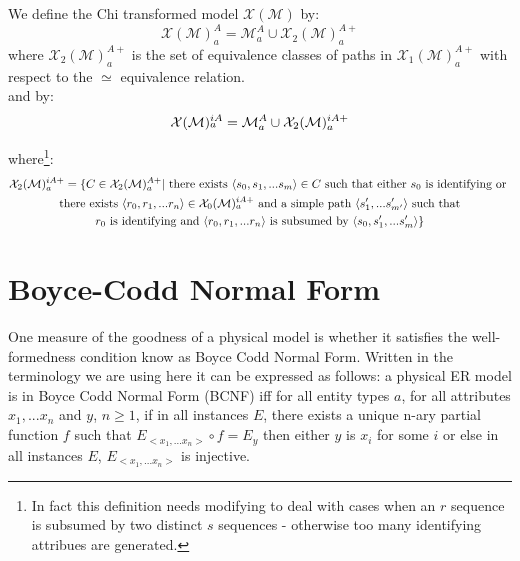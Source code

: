 \documentclass[10pt,a4paper]{article}
\newcommand{\genericmodel}{\mathcal{M}}
\newcommand{\logtophys}{\mathcal{X}}
\newcommand{\chen}{\mathcal{X}_0}
\newcommand{\chigenericmodel}{\logtophys(\genericmodel)}
\newcommand{\allAttrs}{\genericmodel^A}
\newcommand{\attrs}[1]{\allAttrs_{#1}}
\newcommand{\chenFKidAttrs}[1]{\chen(\genericmodel)^{iA+}_{\raisebox{2pt}{$\scriptstyle{#1}$}}}
\newcommand{\chiOne}[1]{{\mathcal{X}_1}(\genericmodel)^{A+}_{#1}}
\newcommand{\chenFKclasses}[1]{{\mathcal{X}_2}(\genericmodel)^{A+}_{#1}}
\newcommand{\chenFKidClasses}[1]{{\mathcal{X}_2}(\genericmodel)^{iA+}_{#1}}
\newcommand{\chiAttrs}[1]{\logtophys(\genericmodel)^A_{#1}}
\newcommand{\chiIdAttrs}[1]{\logtophys(\genericmodel)^{iA}_{\raisebox{2pt}{$\scriptstyle{#1}$}}}
\begin{document}
\noindent We define the Chi transformed model $\chigenericmodel$ by:
$$
\chiAttrs{a} = \attrs{a} \cup \chenFKclasses{a}
$$
\noindent where $\chenFKclasses{a}$ is the set of equivalence classes of paths in $\chiOne{a}$
with respect to the $\simeq$ equivalence relation. \\ 

\noindent and by:
$$
\chiIdAttrs{a} = \attrs{a} \cup \chenFKidClasses{a}
$$

\noindent where\footnote{In fact this definition needs modifying to deal with cases when an $r$ sequence is subsumed by two distinct
$s$ sequences - otherwise too many identifying attribues are generated. %
}:
\begin{multline}
\chenFKidClasses{a} = 
\{ C \in \chenFKclasses{a} | \mbox{ there exists }
\langle s_0, s_1,...s_m \rangle \in C \mbox{ such that either }
 s_0 \mbox{ is identifying or } \\
 \mbox { there exists } \langle r_0, r_1,...r_n \rangle \in \chenFKidAttrs{a} \mbox{ and a simple path }  \langle s'_1,...s'_{m'} \rangle \mbox{ such that } \\
r_0
\mbox{ is identifying and }    
\langle r_0,r_1,...r_n \rangle \mbox{ is subsumed by } \langle s_0, s'_1,...s'_{m} \rangle  \}
\end{multline}
\section{Boyce-Codd Normal Form}
\noindent One measure of the goodness of a physical model is whether it satisfies the well-formedness condition know as Boyce Codd Normal Form.
Written in the terminology we are using here it can be expressed as follows: a physical ER model is in Boyce Codd Normal Form (BCNF) 
 iff
for all entity types $a$, for all attributes $x_1,...x_n$ and $y$, $n \geq 1$, if in all instances $E$, there exists a unique n-ary partial function
$f$ such that $E_{<x_1,...x_n>} \circ f = E_y$ then either $y$ is $x_i$ for some $i$ or else in all instances
$E$, $E_{<x_1,...x_n>}$ is injective.  \\
\end{document}
